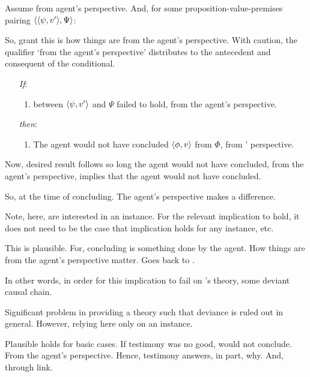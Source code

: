 \begin{note}
  Assume from agent's perspective.
  And, for some proposition-value-premises pairing \(\langle \langle \psi, v' \rangle, \Psi \rangle\):

  So, grant this is how things are from the agent's perspective.
  With caution, the qualifier `from the agent's perspective' distributes to the antecedent and consequent of the conditional.

  \begin{enumerate}
  \item[\emph{If}:]
    \begin{enumerate}[label=\alph*., ref=(\alph*)]
    \item
       between \(\langle \psi, v' \rangle\) and \(\Psi\) failed to hold, from the agent's perspective.
    \end{enumerate}
  \item[\emph{then}:]
    \begin{enumerate}[label=\alph*., ref=(\alph*), resume]
    \item
      The agent would not have concluded \(\langle \phi, v \rangle\) from \(\Phi\), from \vAgent{}' perspective.
    \end{enumerate}
  \end{enumerate}

  Now, desired result follows so long the agent would not have concluded, from the agent's perspective, implies that the agent would not have concluded.

  So, at the time of concluding.
  The agent's perspective makes a difference.

  Note, here, are interested in an instance.
  For the relevant implication to hold, it does not need to be the case that implication holds for any instance, etc.

  This is plausible.
  For, concluding is something done by the agent.
  How things are from the agent's perspective matter.
  Goes back to \citeauthor{Davidson:1963aa}.

  In other words, in order for this implication to fail on \citeauthor{Davidson:1963aa}'s theory, some deviant causal chain.

  Significant problem in providing a theory such that deviance is ruled out in general.
  However, relying here only on an instance.
\end{note}

\begin{note}
  Plausible holds for basic cases.
  If testimony was no good, would not conclude.
  From the agent's perspective.
  Hence, testimony answers, in part, why.
  And, through link.
\end{note}

